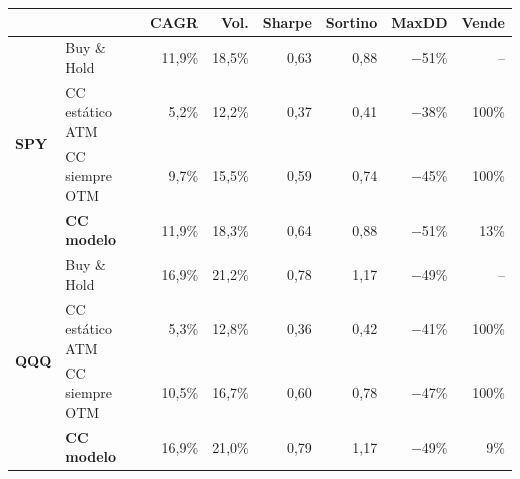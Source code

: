 \begin{tabular}{@{}llrrrrrr@{}}
\toprule
& & \textbf{CAGR} & \textbf{Vol.} & \textbf{Sharpe} & \textbf{Sortino} & \textbf{MaxDD} & \textbf{Vende} \\ \midrule
\multirow{4}{*}{\textbf{SPY}} & Buy \& Hold & 11{,}9\% & 18{,}5\% & 0{,}63 & 0{,}88 & $-$51\% & -- \\
 & CC estático ATM & 5{,}2\% & 12{,}2\% & 0{,}37 & 0{,}41 & $-$38\% & 100\% \\
 & CC siempre OTM & 9{,}7\% & 15{,}5\% & 0{,}59 & 0{,}74 & $-$45\% & 100\% \\
 & \textbf{CC modelo} & 11{,}9\% & 18{,}3\% & 0{,}64 & 0{,}88 & $-$51\% & 13\% \\
\midrule
\multirow{4}{*}{\textbf{QQQ}} & Buy \& Hold & 16{,}9\% & 21{,}2\% & 0{,}78 & 1{,}17 & $-$49\% & -- \\
 & CC estático ATM & 5{,}3\% & 12{,}8\% & 0{,}36 & 0{,}42 & $-$41\% & 100\% \\
 & CC siempre OTM & 10{,}5\% & 16{,}7\% & 0{,}60 & 0{,}78 & $-$47\% & 100\% \\
 & \textbf{CC modelo} & 16{,}9\% & 21{,}0\% & 0{,}79 & 1{,}17 & $-$49\% & 9\% \\
\bottomrule
\end{tabular}
